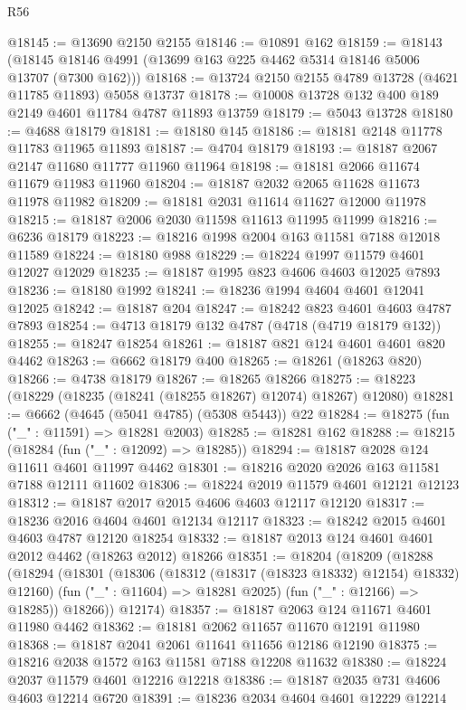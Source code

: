 \begin{lexlean}{R56}
\begin{coremodule}
@18145 := @13690 @2150 @2155
@18146 := @10891 @162
@18159 := @18143
    (@18145 @18146 @4991 (@13699 @163 @225 @4462 @5314 @18146 @5006 @13707 (@7300 @162)))
@18168 := @13724 @2150 @2155 @4789 @13728 (@4621 @11785 @11893) @5058 @13737
@18178 := @10008 @13728 @132 @400 @189 @2149 @4601 @11784 @4787 @11893 @13759
@18179 := @5043 @13728
@18180 := @4688 @18179
@18181 := @18180 @145
@18186 := @18181 @2148 @11778 @11783 @11965 @11893
@18187 := @4704 @18179
@18193 := @18187 @2067 @2147 @11680 @11777 @11960 @11964
@18198 := @18181 @2066 @11674 @11679 @11983 @11960
@18204 := @18187 @2032 @2065 @11628 @11673 @11978 @11982
@18209 := @18181 @2031 @11614 @11627 @12000 @11978
@18215 := @18187 @2006 @2030 @11598 @11613 @11995 @11999
@18216 := @6236 @18179
@18223 := @18216 @1998 @2004 @163 @11581 @7188 @12018 @11589
@18224 := @18180 @988
@18229 := @18224 @1997 @11579 @4601 @12027 @12029
@18235 := @18187 @1995 @823 @4606 @4603 @12025 @7893
@18236 := @18180 @1992
@18241 := @18236 @1994 @4604 @4601 @12041 @12025
@18242 := @18187 @204
@18247 := @18242 @823 @4601 @4603 @4787 @7893
@18254 := @4713 @18179 @132 @4787 (@4718 (@4719 @18179 @132))
@18255 := @18247 @18254
@18261 := @18187 @821 @124 @4601 @4601 @820 @4462
@18263 := @6662 @18179 @400
@18265 := @18261 (@18263 @820)
@18266 := @4738 @18179
@18267 := @18265 @18266
@18275 := @18223 (@18229 (@18235 (@18241 (@18255 @18267) @12074) @18267) @12080)
@18281 := @6662 (@4645 (@5041 @4785) (@5308 @5443)) @22
@18284 := @18275 (fun ("_" : @11591) => @18281 @2003)
@18285 := @18281 @162
@18288 := @18215 (@18284 (fun ("_" : @12092) => @18285))
@18294 := @18187 @2028 @124 @11611 @4601 @11997 @4462
@18301 := @18216 @2020 @2026 @163 @11581 @7188 @12111 @11602
@18306 := @18224 @2019 @11579 @4601 @12121 @12123
@18312 := @18187 @2017 @2015 @4606 @4603 @12117 @12120
@18317 := @18236 @2016 @4604 @4601 @12134 @12117
@18323 := @18242 @2015 @4601 @4603 @4787 @12120 @18254
@18332 := @18187 @2013 @124 @4601 @4601 @2012 @4462 (@18263 @2012) @18266
@18351 := @18204
    (@18209
      (@18288
        (@18294
          (@18301
            (@18306 (@18312 (@18317 (@18323 @18332) @12154) @18332) @12160)
            (fun ("_" : @11604) => @18281 @2025)
            (fun ("_" : @12166) => @18285))
          @18266))
      @12174)
@18357 := @18187 @2063 @124 @11671 @4601 @11980 @4462
@18362 := @18181 @2062 @11657 @11670 @12191 @11980
@18368 := @18187 @2041 @2061 @11641 @11656 @12186 @12190
@18375 := @18216 @2038 @1572 @163 @11581 @7188 @12208 @11632
@18380 := @18224 @2037 @11579 @4601 @12216 @12218
@18386 := @18187 @2035 @731 @4606 @4603 @12214 @6720
@18391 := @18236 @2034 @4604 @4601 @12229 @12214

\end{coremodule}
\end{lexlean}
